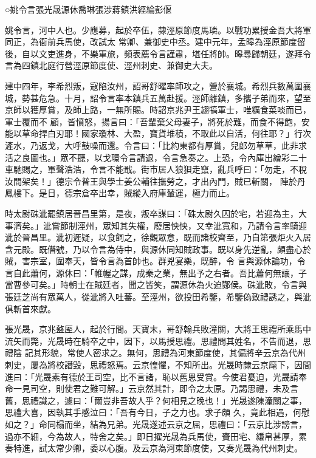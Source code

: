 
\begin{pinyinscope}

 ○姚令言張光晟源休喬琳張涉蔣鎮洪經綸彭偃



 姚令言，河中人也。少應募，起於卒伍，隸涇原節度馬璘。以戰功累授金吾大將軍同正，為衙前兵馬使，改試太
 常卿、兼御史中丞。建中元年，孟暤為涇原節度留後，自以文吏進身，不樂軍旅，頻表薦令言謹肅，堪任將帥。暤尋歸朝廷，遂拜令言為四鎮北庭行營涇原節度使、涇州刺史、兼御史大夫。



 建中四年，李希烈叛，寇陷汝州，詔哥舒曜率師攻之，營於襄城。希烈兵數萬圍襄城，勢甚危急。十月，詔令言率本鎮兵五萬赴援。涇師離鎮，多攜子弟而來，望至京師以獲厚賞，及師上路，一無所賜。時詔京兆尹王翃犒軍士，唯糲食菜啖而已，軍士覆而不
 顧，皆憤怒，揚言曰：「吾輩棄父母妻子，將死於難，而食不得飽，安能以草命捍白刃耶！國家瓊林、大盈，寶貨堆積，不取此以自活，何往耶？」行次滻水，乃返戈，大呼鼓噪而還。令言曰：「比約東都有厚賞，兒郎勿草草，此非求活之良圖也。」眾不聽，以戈環令言請退，令言急奏之。上恐，令內庫出繒彩二十車馳賜之，軍聲浩浩，令言不能戢。街市居人狼狽走竄，亂兵呼曰：「勿走，不稅汝間架矣！」德宗令普王與學士姜公輔往撫勞之，才出內門，賊已斬關，
 陣於丹鳳樓下。是日，德宗倉卒出幸，賊縱入府庫輦運，極力而止。



 時太尉硃泚罷鎮居晉昌里第，是夜，叛卒謀曰：「硃太尉久囚於宅，若迎為主，大事濟矣。」泚嘗節制涇州，眾知其失權，廢居怏怏，又幸泚寬和，乃請令言率騎迎泚於晉昌里。泚初遲疑，以食飼之，徐觀眾意，既而諸校齊至，乃自第張炬火入居含元殿。既僭號，乃以令言為侍中，與源休同知賊政事。既以身先逆亂，頗盡心於賊，害宗室，圍奉天，皆令言為首帥也。群兇宴樂，既醉，令
 言與源休論功，令言自此蕭何，源休曰：「帷幄之謀，成秦之業，無出予之右者。吾比蕭何無讓，子當曹參可矣。」時朝士在賊廷者，聞之皆笑，謂源休為火迫酂侯。硃泚敗，令言與張廷芝尚有眾萬人，從泚將入吐蕃。至涇州，欲投田希鑒，希鑒偽致禮誘之，與泚俱斬首來獻。



 張光晟，京兆盩厔人，起於行間。天寶末，哥舒翰兵敗潼關，大將王思禮所乘馬中流矢而斃，光晟時在騎卒之中，因下，以馬授思禮。思禮問其姓名，不告而退，思禮陰
 記其形貌，常使人密求之。無何，思禮為河東節度使，其偏將辛云京為代州刺史，屢為將校譖毀，思禮怒焉。云京惶懼，不知所出。光晟時隸云京麾下，因間進曰：「光晟素有德於王司空，比不言諸，恥以舊恩受賞。今使君憂迫，光晟請奉命一見司空，則使君之難可解。」云京然其計，即令之太原。乃謁思禮，未及言舊，思禮識之，遽曰：「爾豈非吾故人乎？何相見之晚也！」光晟遂陳潼關之事，思禮大喜，因執其手感泣曰：「吾有今日，子之力也。求子頗
 久，竟此相遇，何慰如之？」命同榻而坐，結為兄弟。光晟遂述云京之屈，思禮曰：「云京比涉謗言，過亦不細，今為故人，特舍之矣。」即日擢光晟為兵馬使，賚田宅、縑帛甚厚，累奏特進，試太常少卿，委以心腹。及云京為河東節度使，又奏光晟為代州刺史。




\end{pinyinscope}

